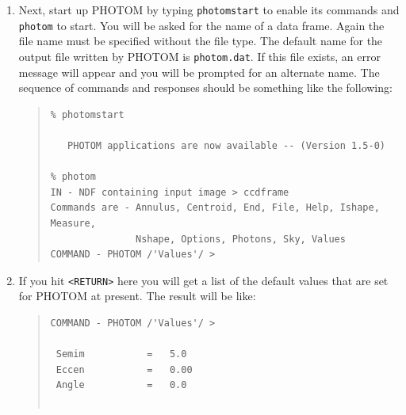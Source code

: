 \documentclass[twoside,11pt]{article}
\newcommand{\xref}[3]{#1}
\begin{document}
\begin{enumerate}
   \xref{{\tt lutneg}}{sun95}{LUTNEG} sets up a negative grey-scale colour
   table\footnote{An image displayed with the {\tt lutneg} colour table
   mimics the appearance of a conventional astronomical photographic plate:
   stars appear as dark spots on a light background.  Various other colour
   tables are available in KAPPA.  For example, {\tt lutgrey} sets up a
   positive grey-scale (light stars against a dark background) and
   {\tt lutheat} sets up a pseudo-heat sequence.}.  {\tt display} displays
   the image, which should appear as a grey-scale plot.  Note that the
   input file name is (and must be) specified without the `{\tt .sdf}'
   file type.

  \item Next, start up PHOTOM by typing {\tt photomstart} to enable its
   commands and \xref{{\tt photom}}{sun45}{PHOTOM} to start.  You will be
   asked for the name of a data frame.  Again the file name must be
   specified without the file type.  The default name for the output file
   written by PHOTOM is {\tt photom.dat}.  If this file exists, an error
   message will appear and you will be prompted for an alternate name.
   The sequence of commands and responses should be something like the
   following:

{\samepage
\begin{quote}
\begin{small}
\begin{verbatim}
% photomstart

   PHOTOM applications are now available -- (Version 1.5-0)

% photom
IN - NDF containing input image > ccdframe
Commands are - Annulus, Centroid, End, File, Help, Ishape, Measure,
               Nshape, Options, Photons, Sky, Values
COMMAND - PHOTOM /'Values'/ > 
\end{verbatim}
\end{small}
\end{quote}
}

  \item If you hit \verb+<RETURN>+ here you will get a list of the default
   values that are set for PHOTOM at present. The result will be like:

\begin{quote}
\begin{small}
\begin{verbatim}
COMMAND - PHOTOM /'Values'/ > 

 Semim           =   5.0
 Eccen           =   0.00
 Angle           =   0.0


\end{verbatim}
\end{small}
\end{quote}
\end{enumerate}
\end{document}
